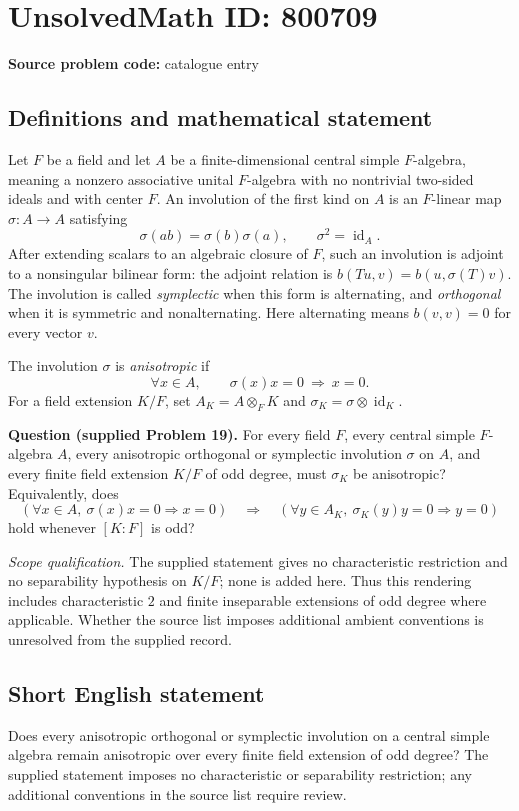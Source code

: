 \documentclass[11pt]{article}
\begin{document}
\section*{UnsolvedMath ID: 800709}
\textbf{Source problem code:} catalogue entry
\subsection{Definitions and mathematical statement}
Let \(F\) be a field and let \(A\) be a finite-dimensional central simple \(F\)-algebra, meaning a nonzero associative unital \(F\)-algebra with no nontrivial two-sided ideals and with center \(F\). An involution of the first kind on \(A\) is an \(F\)-linear map \(\sigma:A\to A\) satisfying
\[
\sigma(ab)=\sigma(b)\sigma(a),\qquad \sigma^2=\operatorname{id}_A.
\]
After extending scalars to an algebraic closure of \(F\), such an involution is adjoint to a nonsingular bilinear form: the adjoint relation is \(b(Tu,v)=b(u,\sigma(T)v)\). The involution is called \emph{symplectic} when this form is alternating, and \emph{orthogonal} when it is symmetric and nonalternating. Here alternating means \(b(v,v)=0\) for every vector \(v\).

The involution \(\sigma\) is \emph{anisotropic} if
\[
\forall x\in A,\qquad \sigma(x)x=0\ \Longrightarrow\ x=0.
\]
For a field extension \(K/F\), set \(A_K=A\otimes_F K\) and \(\sigma_K=\sigma\otimes\operatorname{id}_K\).

\textbf{Question (supplied Problem 19).} For every field \(F\), every central simple \(F\)-algebra \(A\), every anisotropic orthogonal or symplectic involution \(\sigma\) on \(A\), and every finite field extension \(K/F\) of odd degree, must \(\sigma_K\) be anisotropic? Equivalently, does
\[
\left(\forall x\in A,\ \sigma(x)x=0\Longrightarrow x=0\right)
\quad\Longrightarrow\quad
\left(\forall y\in A_K,\ \sigma_K(y)y=0\Longrightarrow y=0\right)
\]
hold whenever \([K:F]\) is odd?

\emph{Scope qualification.} The supplied statement gives no characteristic restriction and no separability hypothesis on \(K/F\); none is added here. Thus this rendering includes characteristic \(2\) and finite inseparable extensions of odd degree where applicable. Whether the source list imposes additional ambient conventions is unresolved from the supplied record.
\subsection{Short English statement}
Does every anisotropic orthogonal or symplectic involution on a central simple algebra remain anisotropic over every finite field extension of odd degree? The supplied statement imposes no characteristic or separability restriction; any additional conventions in the source list require review.
\end{document}
